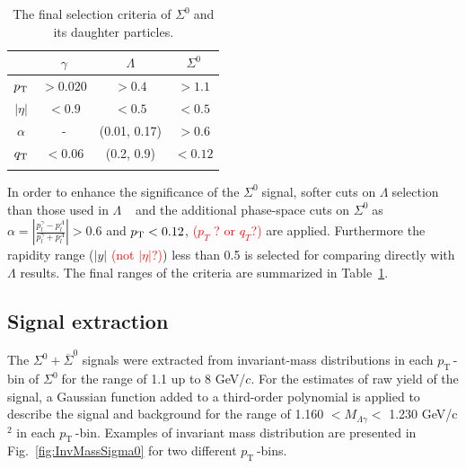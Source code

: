 \documentclass[ALICE,manyauthors]{cernphprep}
\newcommand{\sig}{\ensuremath{\Sigma^0  \; }}
\newcommand{\lam}{\ensuremath{\Lambda \; }}
\newcommand{\pt}{\ensuremath{p_{\mathrm{T}\; }}}
\newcommand{\red}{\textcolor{red}}
\begin{document}
\begin{table}[h!]
\centering
\begin{tabular}{c| cc| c}
 & $\gamma$ & $\Lambda$ & $\Sigma^0$ \\
\hline\noalign{\smallskip}
$p_{\rm{T}}$ & $> 0.020$ & $>0.4$ & $> 1.1$ \\
$|\eta|$ & $< 0.9$ & $< 0.5$ & $< 0.5$ \\
$\alpha$ & - & (0.01, 0.17) & $>0.6$ \\
$q_{\rm{T}}$ & $< 0.06$ & (0.2, 0.9) & $< 0.12$ \\
\hline\noalign{\smallskip}
\end{tabular}
\caption{The final selection criteria of \sig and its daughter particles.}
\label{tab:selection}    
\end{table} 

In order to enhance the significance of the \sig signal, softer cuts on \lam selection than those used in 
\lam~\cite{cite:lambda_pp,cite:Lam-PLB14} and the additional phase-space cuts on \sig as
$\alpha  = |\frac{ p_l^{\gamma} - p_l^{\Lambda} }{ p_l^{\gamma} + p_l^{\Lambda} } |>0.6$ and $p_{\rm{T}} < 0.12$,
\red{($p_T$ ? or $q_T$?)} are applied. Furthermore the rapidity range ($|y|$ \red{(not $|\eta|$?)}) less 
than 0.5 is selected for comparing directly with $\Lambda$ results. The final ranges of the criteria are summarized 
in Table~\ref{tab:selection}.

 \subsection{Signal extraction} 
 \label{subsec:signal}

The $\Sigma^{0} + \overline{\Sigma}^{0}$ signals were extracted from invariant-mass 
distributions in each \pt-bin of \sig for the range of 1.1 up to 8 GeV/$c$. For the estimates of raw yield of
the signal, a Gaussian function added to a third-order polynomial is applied to describe the signal and 
background for the range of 1.160 $< M_{\Lambda\gamma}<$ 1.230 GeV/c$^2$ in each \pt-bin. Examples of 
invariant mass distribution are presented in Fig.~\ref{fig:InvMassSigma0} for two different \pt-bins.
\end{document}

